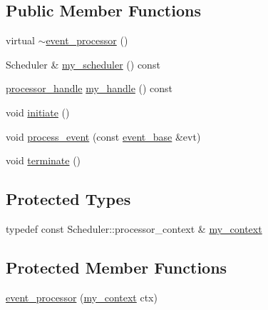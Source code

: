\subsection*{Public Member Functions}
\begin{DoxyCompactItemize}
\item 
virtual \mbox{\hyperlink{classboost_1_1statechart_1_1event__processor_abb48f7659323e4775763bf7ade2c07f8}{$\sim$event\+\_\+processor}} ()
\item 
Scheduler \& \mbox{\hyperlink{classboost_1_1statechart_1_1event__processor_ac31ddbd5fc37e237911285d65c6d1d82}{my\+\_\+scheduler}} () const
\item 
\mbox{\hyperlink{classboost_1_1statechart_1_1event__processor_a0cb7488f303c3c79a6bd52b58ce43a2a}{processor\+\_\+handle}} \mbox{\hyperlink{classboost_1_1statechart_1_1event__processor_ae38f310cc4422e28f7ff57d516f6e6b6}{my\+\_\+handle}} () const
\item 
void \mbox{\hyperlink{classboost_1_1statechart_1_1event__processor_aa08d0a4e2b14026b9085efb05dbc852b}{initiate}} ()
\item 
void \mbox{\hyperlink{classboost_1_1statechart_1_1event__processor_aa3ce5ebe4415e8fac525a34aaa0eee1d}{process\+\_\+event}} (const \mbox{\hyperlink{classboost_1_1statechart_1_1event__base}{event\+\_\+base}} \&evt)
\item 
void \mbox{\hyperlink{classboost_1_1statechart_1_1event__processor_a9134afd6e3f693e035f35d3af434dee9}{terminate}} ()
\end{DoxyCompactItemize}
\subsection*{Protected Types}
\begin{DoxyCompactItemize}
\item 
typedef const Scheduler\+::processor\+\_\+context \& \mbox{\hyperlink{classboost_1_1statechart_1_1event__processor_a99f1c6ec8419ec82f140c5c93c5eb8cd}{my\+\_\+context}}
\end{DoxyCompactItemize}
\subsection*{Protected Member Functions}
\begin{DoxyCompactItemize}
\item 
\mbox{\hyperlink{classboost_1_1statechart_1_1event__processor_af55129557bcd66d615c6c07e5ea47880}{event\+\_\+processor}} (\mbox{\hyperlink{classboost_1_1statechart_1_1event__processor_a99f1c6ec8419ec82f140c5c93c5eb8cd}{my\+\_\+context}} ctx)
\end{DoxyCompactItemize}
